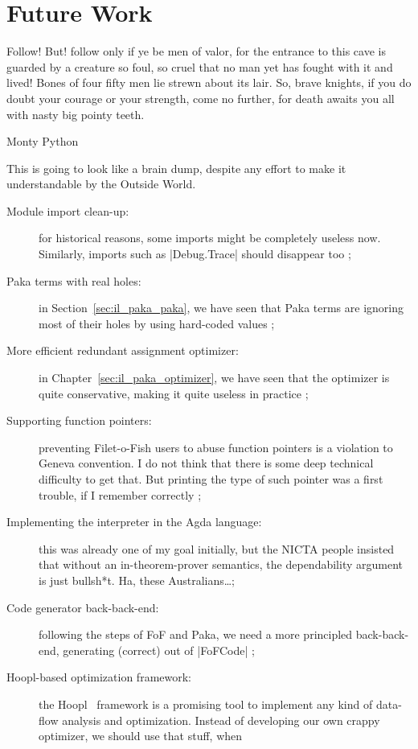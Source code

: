 \chapter{Future Work}
\label{chap:future_work}
\epigraph{Follow!  But! follow only if ye be men of valor, for the entrance
  to this cave is guarded by a creature so foul, so cruel that no man
  yet has fought with it and lived!  Bones of four fifty men lie strewn
  about its lair. So, brave knights, if you do doubt your courage or
  your strength, come no further, for death awaits you all with nasty
  big pointy teeth.}{Monty Python}

This is going to look like a brain dump, despite any effort to make it
understandable by the Outside World.

\begin{description}
\item[Module import clean-up:] for historical reasons, some imports
  might be completely useless now. Similarly, imports such as
  |Debug.Trace| should disappear too ;
\item[Paka terms with real holes:] in Section~\ref{sec:il_paka_paka},
  we have seen that Paka terms are ignoring most of their holes by
  using hard-coded values ;
\item[More efficient redundant assignment optimizer:] in
  Chapter~\ref{sec:il_paka_optimizer}, we have seen that the optimizer
  is quite conservative, making it quite useless in practice ;
\item[Supporting function pointers:] preventing Filet-o-Fish users to
  abuse function pointers is a violation to Geneva convention. I do
  not think that there is some deep technical difficulty to get
  that. But printing the type of such pointer was a first trouble, if
  I remember correctly ;
\item[Implementing the interpreter in the Agda language:] this was
  already one of my goal initially, but the NICTA people insisted that
  without an in-theorem-prover semantics, the dependability argument is just
  bullsh*t. Ha, these Australians\ldots ;
\item[Code generator back-back-end:] following the steps of FoF and
  Paka, we need a more principled back-back-end, generating (correct)
  out of |FoFCode| ;
\item[Hoopl-based optimization framework:] the
  Hoopl~\cite{ramsey-hoopl} framework is a promising tool to implement
  any kind of data-flow analysis and optimization. Instead of
  developing our own crappy optimizer, we should use that stuff, when

\end{description}
